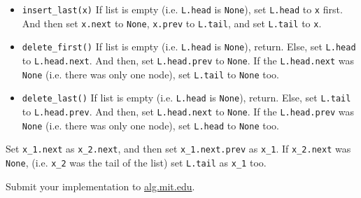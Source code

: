 \documentclass[12pt,twoside]{article}
\begin{document}
\begin{problems}
\begin{problemparts}
\begin{itemize}
  \item \texttt{insert\_last(x)} If list is empty
    (i.e. \texttt{L.head} is \texttt{None}), set \texttt{L.head} to
    \texttt{x} first. And then set \texttt{x.next} to \texttt{None},
    \texttt{x.prev} to \texttt{L.tail}, and set \texttt{L.tail} to
    \texttt{x}.

  \item \texttt{delete\_first()} If list is empty
    (i.e. \texttt{L.head} is \texttt{None}), return. Else, set
    \texttt{L.head} to \texttt{L.head.next}. And then, set
    \texttt{L.head.prev} to \texttt{None}.  If the
    \texttt{L.head.next} was \texttt{None} (i.e. there was only one
    node), set \texttt{L.tail} to \texttt{None} too.

  \item \texttt{delete\_last()} If list is empty (i.e. \texttt{L.head}
    is \texttt{None}), return. Else, set \texttt{L.tail} to
    \texttt{L.head.prev}. And then, set \texttt{L.head.next} to
    \texttt{None}. If the \texttt{L.head.prev} was \texttt{None}
    (i.e. there was only one node), set \texttt{L.head} to
    \texttt{None} too.
  \end{itemize}

  \problempart %
  Set \texttt{x\_1.next} as \texttt{x\_2.next}, and then set
  \texttt{x\_1.next.prev} as \texttt{x\_1}. If \texttt{x\_2.next} was
  \texttt{None}, (i.e. \texttt{x\_2} was the tail of the list) set
  \texttt{L.tail} as \texttt{x\_1} too.

  \problempart %
  
  
  \problempart Submit your implementation to
  {\small\url{alg.mit.edu}}.
\end{problemparts}

\end{problems}
\end{document}
